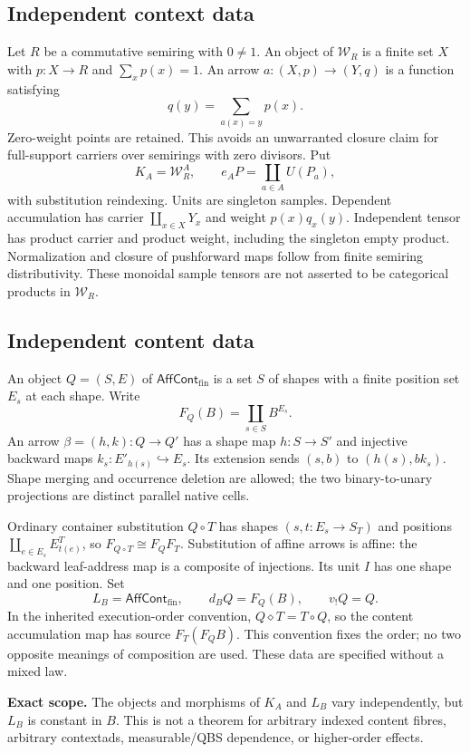 \documentclass[11pt,a4paper]{article}
\newcommand{\W}{\mathcal W_R}
\newcommand{\Aff}{\mathsf{AffCont}_{\mathrm{fin}}}
\newcommand{\status}[1]{\textbf{#1.}}
\begin{document}
\subsection{Independent context data}
Let $R$ be a commutative semiring with $0\ne1$. An object of $\W$ is a finite
set $X$ with $p:X\to R$ and $\sum_xp(x)=1$. An arrow
$a:(X,p)\to(Y,q)$ is a function satisfying
\[
 q(y)=\sum_{a(x)=y}p(x).
\]
Zero-weight points are retained. This avoids an unwarranted closure claim
for full-support carriers over semirings with zero divisors. Put
\[
 K_A=\W^A,\qquad e_AP=\coprod_{a\in A}U(P_a),
\]
with substitution reindexing. Units are singleton samples. Dependent
accumulation has carrier $\coprod_{x\in X}Y_x$ and weight $p(x)q_x(y)$.
Independent tensor has product carrier and product weight, including the
singleton empty product. Normalization and closure of pushforward maps
follow from finite semiring distributivity. These monoidal sample tensors
are not asserted to be categorical products in $\W$.

\subsection{Independent content data}
An object $Q=(S,E)$ of $\Aff$ is a set $S$ of shapes with a finite position
set $E_s$ at each shape. Write
\[
 F_Q(B)=\coprod_{s\in S}B^{E_s}.
\]
An arrow $\beta=(h,k):Q\to Q'$ has a shape map $h:S\to S'$ and injective
backward maps $k_s:E'_{h(s)}\hookrightarrow E_s$. Its extension sends
$(s,b)$ to $(h(s),b k_s)$. Shape merging and occurrence deletion are allowed;
the two binary-to-unary projections are distinct parallel native cells.

Ordinary container substitution $Q\circ T$ has shapes $(s,t:E_s\to S_T)$
and positions $\coprod_{e\in E_s}E^T_{t(e)}$, so
$F_{Q\circ T}\cong F_QF_T$. Substitution of affine arrows is affine:
the backward leaf-address map is a composite of injections. Its unit $I$
has one shape and one position. Set
\[
 L_B=\Aff,\qquad d_BQ=F_Q(B),\qquad v_!Q=Q.
\]
In the inherited execution-order convention, $Q\diamond T=T\circ Q$,
so the content accumulation map has source $F_T(F_QB)$.
This convention fixes the order; no two opposite meanings of composition
are used. These data are specified without a mixed law.

\status{Exact scope}
The objects and morphisms of $K_A$ and $L_B$ vary independently, but
$L_B$ is constant in $B$. This is not a theorem for arbitrary indexed
content fibres, arbitrary contextads, measurable/QBS dependence, or
higher-order effects.
\end{document}
